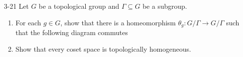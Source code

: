 \begin{problem}{3-21}
Let $G$ be a topological group and $\Gamma \subseteq G$ be a subgroup.
\begin{enumerate}[label={(\alph*)}]
    \item For each $g\in G$, show that there is a homeomorphism $\theta_{g}: G/\Gamma \to G/\Gamma$ such that the following diagram commutes
          \begin{figure}[htp]
              \centering
          \end{figure}
    \item Show that every coset space is topologically homogeneous.
\end{enumerate}
\end{problem}

